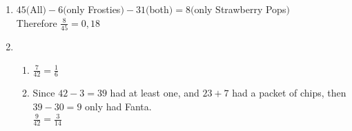  \begin{eocsolutions}{}{
\begin{enumerate}[itemsep=5pt, label=\textbf{\arabic*}. ] 


\item %

$45($All$) - 6($only Frosties$) - 31 ($both$) = 8 ($only Strawberry Pops$)$\\
Therefore $\frac{8}{45}=0,18$

\item %
    \begin{enumerate}[noitemsep, label=\textbf{(\alph*)} ]
    \item $\frac{7}{42} = \frac{1}{6}$

    \item Since $42 - 3 = 39$ had at least one, and $23 + 7$ had a packet of chips, then $39 - 30 = 9$ only had Fanta.\\
    $\frac{9}{42} = \frac{3}{14}$
    \end{enumerate}


\end{enumerate}}
\end{eocsolutions}
